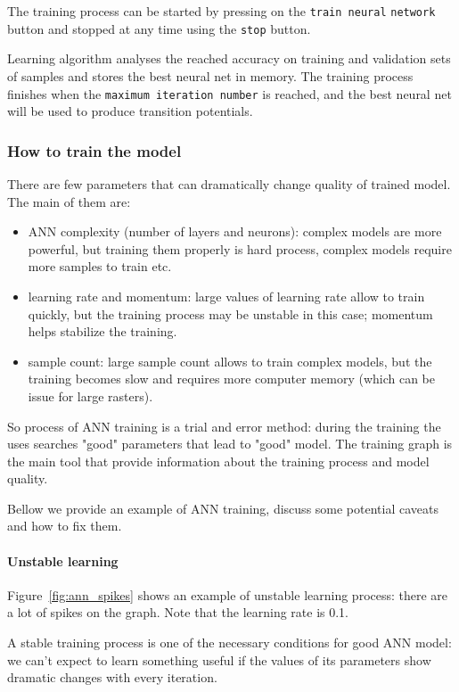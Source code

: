 \documentclass{report}
\begin{document}
The training process can be started by pressing on the \verb+train neural+ \verb+network+ button and stopped at any time
using the \verb+stop+ button.

Learning algorithm analyses the reached accuracy on training and validation sets of samples and
stores the best neural net in memory. The training process finishes when the \verb+maximum iteration number+ is
reached, and the best neural net will be used to produce transition potentials.

\subsubsection{How to train the model}
There are few parameters that can dramatically change quality of trained model. 
The main of them are:
\begin{itemize}
  \item ANN complexity (number of layers and neurons): complex models are more powerful, but training them properly is hard process, complex models require more samples to train etc. 
  \item learning rate and momentum: large values of learning rate allow to train quickly, but the training process may be unstable in this case; momentum helps stabilize the training.
  \item sample count: large sample count allows to train complex models, but the training becomes slow and requires more computer memory (which can be issue for large rasters).
\end{itemize}

So process of ANN training is a trial and error method: during the training the uses searches "good" parameters that lead to "good" model.
The training graph is the main tool that provide information about the training process and model quality.

Bellow we provide an example of ANN training, discuss some potential caveats and how to fix them.


\paragraph{Unstable learning} Figure~\ref{fig:ann_spikes} shows an example of unstable learning process: there are a lot of spikes on the graph.
Note that the learning rate is 0.1.

A stable training process is one of the necessary conditions for good ANN model: we can't expect 
to learn something useful if the  values of its parameters show dramatic changes with every iteration.
\end{document}
